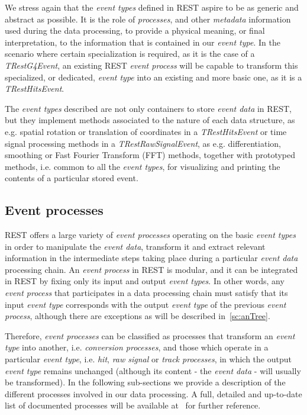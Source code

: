 We stress again that the \emph{event types} defined in REST aspire to be as generic and abstract as possible. It is the role of \emph{processes}, and other \emph{metadata} information used during the data processing, to provide a physical meaning, or final interpretation, to the information that is contained in our \emph{event type}. In the scenario where certain specialization is required, as it is the case of a \emph{TRestG4Event}, an existing REST \emph{event process} will be capable to transform this specialized, or dedicated, \emph{event type} into an existing and more basic one, as it is a \emph{TRestHitsEvent}.

The \emph{event types} described are not only containers to store \emph{event data} in REST, but they implement methods associated to the nature of each data structure, as e.g. spatial rotation or translation of coordinates in a \emph{TRestHitsEvent} or time signal processing methods in a \emph{TRestRawSignalEvent}, as e.g. differentiation, smoothing or Fast Fourier Transform (FFT) methods, together with prototyped methods, i.e. common to all the \emph{event types}, for visualizing and printing the contents of a particular stored event.

\subsection{Event processes}\label{sc:evProcesses}

REST offers a large variety of \emph{event processes} operating on the basic \emph{event types} in order to manipulate the \emph{event data}, transform it and extract relevant information in the intermediate steps taking place during a particular \emph{event data} processing chain. An \emph{event process} in REST is modular, and it can be integrated in REST by fixing only its input and output \emph{event types}. In other words, any \emph{event process} that participates in a data processing chain must satisfy that its input \emph{event type} corresponds with the output \emph{event type} of the previous \emph{event process}, although there are exceptions as will be described in~\ref{sc:anTree}.

Therefore, \emph{event processes} can be classified as processes that transform an \emph{event type} into another, i.e. \emph{conversion processes}, and those which operate in a particular \emph{event type}, i.e. \emph{hit}, \emph{raw signal} or \emph{track processes}, in which the output \emph{event type} remains unchanged (although its content - the \emph{event data} - will usually be transformed). In the following sub-sections we provide a description of the different processes involved in our data processing. A full, detailed and up-to-date list of documented processes will be available at~\cite{RESTsultan} for further reference.

